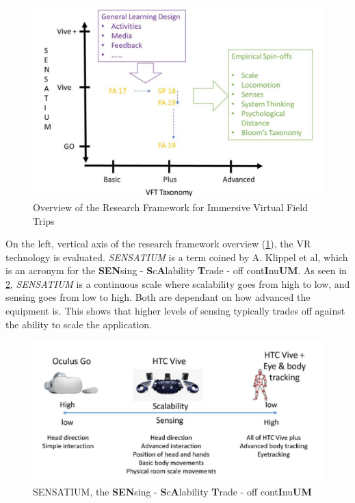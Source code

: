         \FloatBarrier
        \begin{figure}[!ht]
            \centering
            \includegraphics[width=0.7\linewidth]{figures/framework_3.PNG}
            \caption{Overview of the Research Framework for Immersive Virtual Field Trips}
            \label{fig:framework}
        \end{figure}
        \FloatBarrier
        
        On the left, vertical axis of the research framework overview (\cref{fig:framework}), the VR technology is evaluated. \emph{SENSATIUM} is a term coined by A. Klippel et al, which is an acronym for the \textbf{SEN}sing - \textbf{S}c\textbf{A}lability \textbf{T}rade - off cont\textbf{I}nu\textbf{UM}. As seen in \cref{fig:sensatium}, \emph{SENSATIUM} is a continuous scale where scalability goes from high to low, and sensing goes from low to high. Both are dependant on how advanced the equipment is. This shows that higher levels of sensing typically trades off against the ability to scale the application.
        
        \FloatBarrier
        \begin{figure}[!ht]
            \centering
            \includegraphics[width=0.7\linewidth]{figures/framework_technology_3.PNG}
            \caption{SENSATIUM, the \textbf{SEN}sing - \textbf{S}c\textbf{A}lability \textbf{T}rade - off cont\textbf{I}nu\textbf{UM}}
            \label{fig:sensatium}
        \end{figure}
        \FloatBarrier
        
